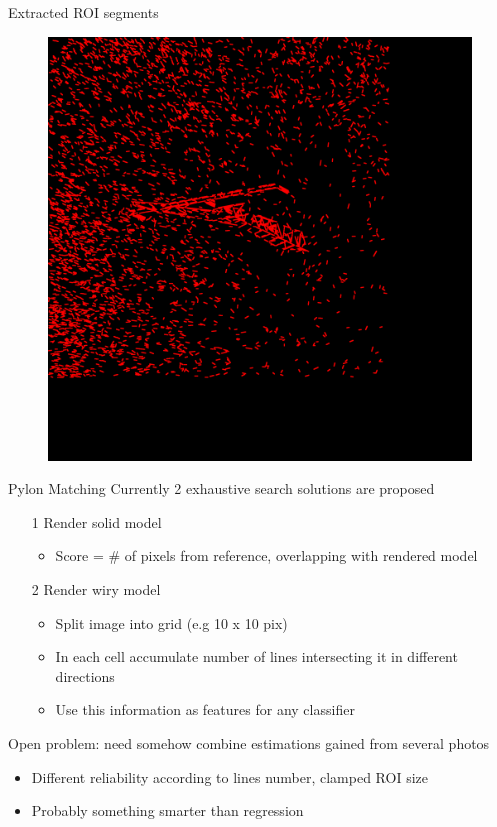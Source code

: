 \documentclass{beamer}
\begin{document}
\begin{frame}[t, fragile]{Extracted ROI segments}
\begin{figure}
\centering
\includegraphics[scale=0.11]{roi}
\end{figure}
\end{frame}

\begin{frame}[t, fragile]{Pylon Matching}
Currently 2 exhaustive search solutions are proposed
\begin{itemize} 
\item[1] Render solid model
\begin{itemize} 
\item Score = \# of pixels from reference, overlapping with rendered model
\end{itemize}
\item[2] Render wiry model
\begin{itemize} 
\item Split image into grid (e.g 10 x 10 pix)
\item In each cell accumulate number of lines intersecting it in different directions
\item Use this information as features for any classifier
\end{itemize}
\end{itemize}

Open problem: need somehow combine estimations gained from several photos
\begin{itemize} 
\item Different reliability according to lines number, clamped ROI size
\item Probably something smarter than regression 
\end{itemize}
\end{frame}
\end{document}
